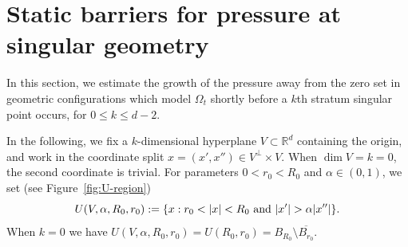 \documentclass[11pt]{amsart}
\numberwithin{equation}{section}
\numberwithin{figure}{section}
\theoremstyle{plain}
\theoremstyle{definition}
\theoremstyle{remark}
\theoremstyle{plain}
\def\R{\mathbb{R}}
\begin{document}
\section{Static barriers for pressure at singular geometry}\label{sec:static-barriers}

In this section, we estimate the growth of the pressure away from the zero set in geometric configurations which model $\Omega_t$ shortly before a $k$th stratum singular point occurs, for $0\leq k \leq d-2$. 

In the following, we fix a $k$-dimensional hyperplane $V\subset \R^d$ containing the origin,
and work in the coordinate split $x = (x',x'')\in V^\perp\times V$. When $\dim V=k=0$, the second coordinate is trivial. For parameters $0 < r_0 < R_0$ and $\alpha\in (0,1)$, we set (see Figure~\ref{fig:U-region})
\begin{equation}\label{eq:u_alpha}
    U(V,\alpha,R_0,r_0) := \{ x : r_0 < |x| < R_0 \hbox{ and } |x'| > \alpha |x''| \}.
\end{equation}
When $k=0$ we have $U(V,\alpha, R_0, r_0)=U( R_0, r_0)= B_{R_0}\setminus \overline{B_{r_0}}$.
\end{document}
